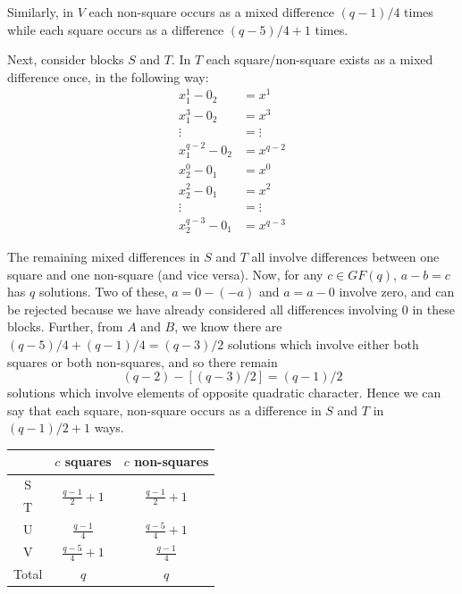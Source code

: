 \documentclass[11pt, a4paper]{book}\usepackage[]{graphicx}\usepackage[]{xcolor}
\begin{document}
Similarly, in $V$ each non-square occurs as a mixed
difference $(q - 1)/4$ times while each square occurs as a
difference $(q - 5)/4 + 1$ times.

Next, consider blocks $S$
and $T$. In $T$ each square/non-square exists as a mixed
difference once, in the following way:
\begin{align*}
       x_1^1 - 0_2   &= x^1      \\
       x_1^3 - 0_2   &= x^3      \\
           \vdots    &= \vdots   \\             
   x^{q-2}_1 - 0_2   &= x^{q - 2}
\end{align*}
\begin{align*}
       x_2^0 - 0_1   &= x^0      \\
       x_2^2 - 0_1   &= x^2      \\
    \vdots           &= \vdots   \\         
   x^{q-3}_2 - 0_1   &= x^{q-3}
\end{align*}

The remaining mixed differences in $S$ and $T$ all involve
differences between one square and one non-square (and vice
versa). Now, for any $c \in GF(q)$, $a - b = c$ has $q$
solutions. Two of these, $a = 0 - (-a)$ and $a = a - 0$
involve zero, and can be rejected because we have already
considered all differences involving 0 in these blocks.
Further, from $A$ and $B$, we know there are
$(q - 5)/4 + (q - 1)/4 = (q - 3)/2$ solutions which involve
either both squares or both non-squares, and so there remain
\begin{equation}
(q - 2) - [(q - 3)/2] = (q - 1)/2
\end{equation}
solutions which involve elements of opposite quadratic
character. Hence we can say that each square, non-square
occurs as a difference in $S$ and $T$ in $(q - 1)/2 + 1$ ways.

\begin{center}
\begin{tabular}{c|cc}
       & $c$ squares & $c$ non-squares \\ \hline
 S     & \multirow{2}{*}{$\frac{q - 1}{2} + 1$} & \multirow{2}{*}{$\frac{q - 1}{2} + 1$}                                  \\
 T     &                       &                       \\
 U     & $\frac{q - 1}{4}$     & $\frac{q - 5}{4} + 1$ \\
 V     & $\frac{q - 5}{4} + 1$ & $\frac{q - 1}{4}$     \\ \hline
 Total &        $q$            &      $q$
\end{tabular}
\end{center}
\end{document}

